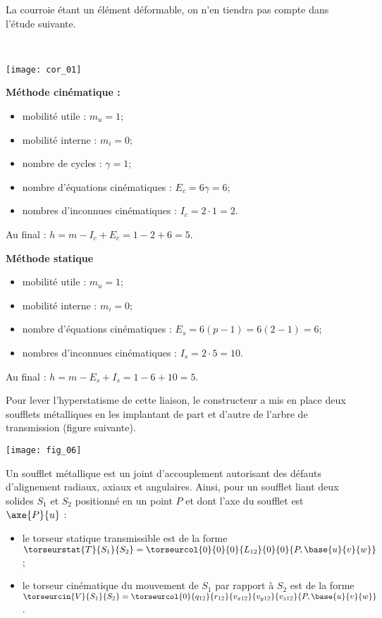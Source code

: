 \begin{multicols}{2}
\ifprof
\else
La courroie étant un élément déformable, on n’en tiendra pas compte dans l’étude suivante.
\fi
{}
\ifprof
\begin{corrige} ~\\

\begin{center}
\texttt{[image: cor\_01]}
\end{center}


\textbf{Méthode cinématique :}
\begin{itemize}
\item mobilité utile : $m_u=1$;
\item mobilité interne : $m_i=0$;
\item nombre de cycles : $\gamma = 1$;
\item nombre d'équations cinématiques : $E_c=6\gamma = 6$;
\item nombres d'inconnues cinématiques : $I_c=2\cdot 1=2$.
\end{itemize}
Au final : $h=m-I_c+E_c=1-2+6=5$.

\textbf{Méthode statique}
\begin{itemize}
\item mobilité utile : $m_u=1$;
\item mobilité interne : $m_i=0$;
\item nombre d'équations cinématiques : $E_s=6(p-1)=6(2-1)= 6$;
\item nombres d'inconnues cinématiques : $I_s=2\cdot 5 = 10$.
\end{itemize}
Au final : $h=m-E_s+I_s=1-6+10=5$.

\end{corrige}
\else
\fi

\ifprof
\else
Pour lever l’hyperstatisme de cette liaison, le constructeur a mis en place deux soufflets métalliques en les implantant de part et d’autre de l’arbre de transmission (figure suivante).

\begin{center}
\texttt{[image: fig\_06]}
\end{center}

Un soufflet métallique est un joint d’accouplement autorisant des défauts d’alignement radiaux, axiaux et angulaires. Ainsi, pour un soufflet liant deux solides $S_1$ et $S_2$ positionné en un point $P$ et dont l’axe du soufflet est $\axe{P}{u}$ :
\begin{itemize}
\item le torseur statique transmissible est de la forme $\torseurstat{T}{S_1}{S_2}=\torseurcol{0}{0}{0}{L_{12}}{0}{0}{P,\base{u}{v}{w}}$;
\item le torseur cinématique du mouvement de $S_1$ par rapport à $S_2$ est de la forme $\torseurcin{V}{S_1}{S_2}=\torseurcol{0}{q_{12}}{r_{12}}{v_{x12}}{v_{y12}}{v_{z12}}{P,\base{u}{v}{w}}$.
\end{itemize}



\end{multicols}
